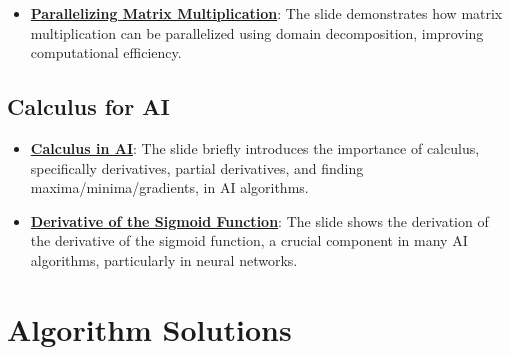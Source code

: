 \documentclass{article}%
\begin{document}
\begin{itemize}[leftmargin=*]
\item \href{\url{https://purdue.brightspace.com/d2l/common/assets/pdfjs-d2l-dist/1.0.14-legacy/web/viewer.html?file=\%252Fcontent\%252Fenforced\%252F1095467-wl.202510.CS.24300.001\%252F04L1-Linear\%20Algebra\%20Primer.pdf\%253Fou\%253D1095467\&lang=en-us\&container=d2l-fileviewer-rendered-pdf\&fullscreen=d2l-fileviewer-rendered-pdf-dialog\&height=667}#page=18}{\textbf{Parallelizing Matrix Multiplication}}: The slide demonstrates how matrix multiplication can be parallelized using domain decomposition, improving computational efficiency.%
\end{itemize}

%
\subsection{Calculus for AI}%
\label{subsec:CalculusforAI}%
\begin{itemize}[leftmargin=*]%
\item \href{\url{https://purdue.brightspace.com/d2l/common/assets/pdfjs-d2l-dist/1.0.14-legacy/web/viewer.html?file=\%252Fcontent\%252Fenforced\%252F1095467-wl.202510.CS.24300.001\%252F04L1-Linear\%20Algebra\%20Primer.pdf\%253Fou\%253D1095467\&lang=en-us\&container=d2l-fileviewer-rendered-pdf\&fullscreen=d2l-fileviewer-rendered-pdf-dialog\&height=667}#page=19}{\textbf{Calculus in AI}}: The slide briefly introduces the importance of calculus, specifically derivatives, partial derivatives, and finding maxima/minima/gradients, in AI algorithms.%
\item \href{\url{https://purdue.brightspace.com/d2l/common/assets/pdfjs-d2l-dist/1.0.14-legacy/web/viewer.html?file=\%252Fcontent\%252Fenforced\%252F1095467-wl.202510.CS.24300.001\%252F04L1-Linear\%20Algebra\%20Primer.pdf\%253Fou\%253D1095467\&lang=en-us\&container=d2l-fileviewer-rendered-pdf\&fullscreen=d2l-fileviewer-rendered-pdf-dialog\&height=667}#page=21}{\textbf{Derivative of the Sigmoid Function}}: The slide shows the derivation of the derivative of the sigmoid function, a crucial component in many AI algorithms, particularly in neural networks.%
\end{itemize}

%
\section{Algorithm Solutions}%
\label{sec:AlgorithmSolutions}%
\end{document}
